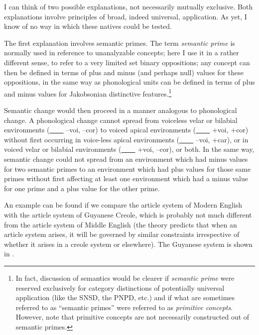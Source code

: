I can think of two possible explanations, not necessarily mutually exclusive. Both explanations involve principles of broad, indeed universal, application. As yet, I know of no way in which these natives could be tested.

The first explanation involves semantic primes. The term \textit{semantic prime} is normally used in reference to unanalyzable concepts; here I use it in a rather different sense, to refer to a very limited set binary oppositions; any concept can then be defined in terms of plus and minus (and perhaps null) values for these oppositions, in the same way as phonological units can be defined in terms of plus and minus values for Jakobsonian distinctive features.\footnote{In fact, discussion of semantics would be clearer if \textit{semantic prime} were reserved exclusively for category distinctions of potentially universal application (like the SNSD, the PNPD, etc.) and if what are sometimes referred to as ``semantic primes'' were referred to as \textit{primitive concepts}. However, note that primitive concepts are not necessarily constructed out of semantic primes.}

Semantic change would then proceed in a manner analogous to phonological change. A phonological change cannot spread from voiceless velar or bilabial environments (\underline{~~~~} --voi, --cor) to voiced apical environments (\underline{~~~~} +voi, +cor) without first occurring in voice-less apical environments (\underline{~~~~} --voi, +car), or in voiced velar or bilabial environments (\underline{~~~~} +voi, --cor), or both. In the same way, semantic change could not spread from an environment which had minus values for two semantic primes to an environment which had plus values for those same primes without first affecting at least one environment which had a minus value for one prime and a plus value for the other prime. 

An example can be found if we compare the article system of Modern English with the article system of Guyanese Creole, which is probably not much different from the article system of Middle English (the theory predicts that when an article system arises, it will be governed by similar constraints irrespective of whether it arises in a creole system or elsewhere). The Guyanese system is shown in . %

